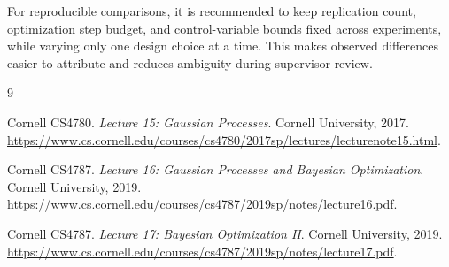 \documentclass[11pt]{article}
\begin{document}
For reproducible comparisons, it is recommended to keep replication count, optimization step budget, and control-variable bounds fixed across experiments, while varying only one design choice at a time. This makes observed differences easier to attribute and reduces ambiguity during supervisor review.

\begin{thebibliography}{9}

Cornell CS4780.
\newblock \emph{Lecture 15: Gaussian Processes}.
\newblock Cornell University, 2017.
\newblock \url{https://www.cs.cornell.edu/courses/cs4780/2017sp/lectures/lecturenote15.html}.

Cornell CS4787.
\newblock \emph{Lecture 16: Gaussian Processes and Bayesian
Optimization}.
\newblock Cornell University, 2019.
\newblock \url{https://www.cs.cornell.edu/courses/cs4787/2019sp/notes/lecture16.pdf}.

Cornell CS4787.
\newblock \emph{Lecture 17: Bayesian Optimization II}.
\newblock Cornell University, 2019.
\newblock \url{https://www.cs.cornell.edu/courses/cs4787/2019sp/notes/lecture17.pdf}.

\end{thebibliography}
\end{document}
